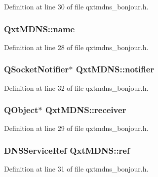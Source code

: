 Definition at line 30 of file qxtmdns\-\_\-bonjour.\-h.

\hypertarget{class_qxt_m_d_n_s_a33c67c48dc301a8706919e0af75b9729}{
\subsubsection[{name}]{ Qxt\-M\-D\-N\-S\-::name}}\label{class_qxt_m_d_n_s_a33c67c48dc301a8706919e0af75b9729}


Definition at line 28 of file qxtmdns\-\_\-bonjour.\-h.

\hypertarget{class_qxt_m_d_n_s_a29ea9468b9e88400955341ffb1846245}{
\subsubsection[{notifier}]{\setlength{\rightskip}{0pt plus 5cm}Q\-Socket\-Notifier$\ast$ Qxt\-M\-D\-N\-S\-::notifier}}\label{class_qxt_m_d_n_s_a29ea9468b9e88400955341ffb1846245}


Definition at line 32 of file qxtmdns\-\_\-bonjour.\-h.

\hypertarget{class_qxt_m_d_n_s_adabe8b750f25f9dfa3d9e052a62df927}{
\subsubsection[{receiver}]{\setlength{\rightskip}{0pt plus 5cm}Q\-Object$\ast$ Qxt\-M\-D\-N\-S\-::receiver}}\label{class_qxt_m_d_n_s_adabe8b750f25f9dfa3d9e052a62df927}


Definition at line 29 of file qxtmdns\-\_\-bonjour.\-h.

\hypertarget{class_qxt_m_d_n_s_a34e3ccaa5633fd035d66a16c1f1395fa}{
\subsubsection[{ref}]{\setlength{\rightskip}{0pt plus 5cm}D\-N\-S\-Service\-Ref Qxt\-M\-D\-N\-S\-::ref}}\label{class_qxt_m_d_n_s_a34e3ccaa5633fd035d66a16c1f1395fa}


Definition at line 31 of file qxtmdns\-\_\-bonjour.\-h.



